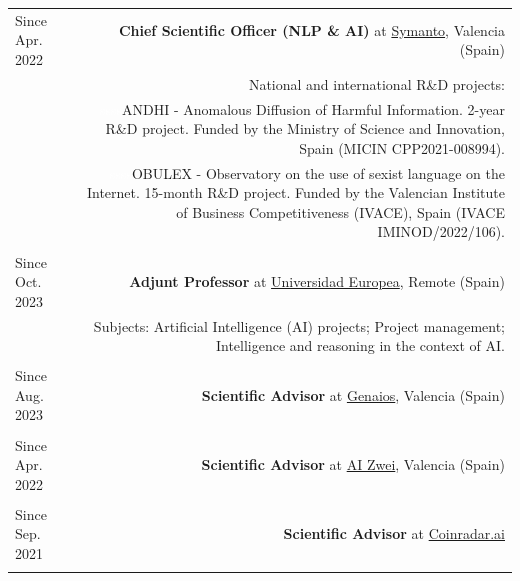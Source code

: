\documentclass[10pt]{article}
\begin{document}
\begin{tabular}{L!{\VRule}R}

Since Apr.~ 2022 &{\textbf{Chief Scientific Officer (NLP \& AI)} at \href{https://www.symanto.com/}{Symanto}, Valencia (Spain)}\\
&\scriptsize{National and international R\&D projects:}\\
&\scriptsize{\textcolor{white}{ssss}ANDHI - Anomalous Diffusion of Harmful Information. 2-year R\&D project. Funded by the Ministry of Science and Innovation, Spain (MICIN CPP2021-008994).}\\
&\scriptsize{\textcolor{white}{ssss}OBULEX - Observatory on the use of sexist language on the Internet. 15-month R\&D project. Funded by the Valencian Institute of Business Competitiveness (IVACE), Spain (IVACE IMINOD/2022/106)}. \\
&\\

Since Oct.~ 2023 &{\textbf{Adjunt Professor} at \href{https://universidadeuropea.com/}{Universidad Europea}, Remote (Spain)}\\
& \scriptsize{Subjects: Artificial Intelligence (AI) projects; Project management; Intelligence and reasoning in the context of AI.}\\
&\\

Since Aug.~ 2023 &{\textbf{Scientific Advisor} at \href{https://genaios.ai/}{Genaios}, Valencia (Spain)}\\
&\\

Since Apr.~ 2022 &{\textbf{Scientific Advisor} at \href{https://www.aizwei.com/}{AI Zwei}, Valencia (Spain)}\\
&\\

Since Sep.~ 2021 &{\textbf{Scientific Advisor} at \href{https://coinradar.ai/}{Coinradar.ai}}\\
&\\
\end{tabular}
\end{document}
